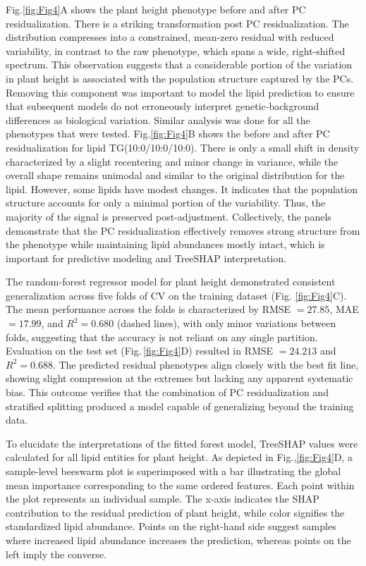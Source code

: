 \documentclass[10pt,letterpaper]{article}
\begin{document}
\begin{itemize}
Fig.\ref{fig:Fig4}A shows the plant height phenotype before and after PC residualization. There is a striking transformation post PC residualization. The distribution compresses into a constrained, mean-zero residual with reduced variability, in contrast to the raw phenotype, which spans a wide, right-shifted spectrum. This observation suggests that a considerable portion of the variation in plant height is associated with the population structure captured by the PCs. Removing this component was important to model the lipid prediction to ensure that subsequent models do not erroneously interpret genetic-background differences as biological variation. Similar analysis was done for all the phenotypes that were tested. Fig.\ref{fig:Fig4}B shows the before and after PC residualization for lipid TG(10:0/10:0/10:0). There is only a small shift in density characterized by a slight recentering and minor change in variance, while the overall shape remains unimodal and similar to the original distribution for the lipid. However, some lipids have modest changes. It indicates that the population structure accounts for only a minimal portion of the variability. Thus, the majority of the signal is preserved post-adjustment. Collectively, the panels demonstrate that the PC residualization effectively removes strong structure from the phenotype while maintaining lipid abundances mostly intact, which is important for predictive modeling and TreeSHAP interpretation.

The random-forest regressor model for plant height demonstrated consistent generalization across five folds of CV on the training dataset (Fig. \ref{fig:Fig4}C). The mean performance across the folds is characterized by RMSE $=27.85$, MAE $=17.99$, and $R^2=0.680$ (dashed lines), with only minor variations between folds, suggesting that the accuracy is not reliant on any single partition. Evaluation on the test set (Fig.\,\ref{fig:Fig4}D) resulted in RMSE $=24.213$ and $R^2=0.688$. The predicted residual phenotypes align closely with the best fit line, showing slight compression at the extremes but lacking any apparent systematic bias. This outcome verifies that the combination of PC residualization and stratified splitting produced a model capable of generalizing beyond the training data.

To elucidate the interpretations of the fitted forest model, TreeSHAP values were calculated for all lipid entities for plant height. As depicted in Fig.,\ref{fig:Fig4}D, a sample-level beeswarm plot is superimposed with a bar illustrating the global mean importance corresponding to the same ordered features. Each point within the plot represents an individual sample. The x-axis indicates the SHAP contribution to the residual prediction of plant height, while color signifies the standardized lipid abundance. Points on the right-hand side suggest samples where increased lipid abundance increases the prediction, whereas points on the left imply the converse. 


\end{itemize}
\end{document}
